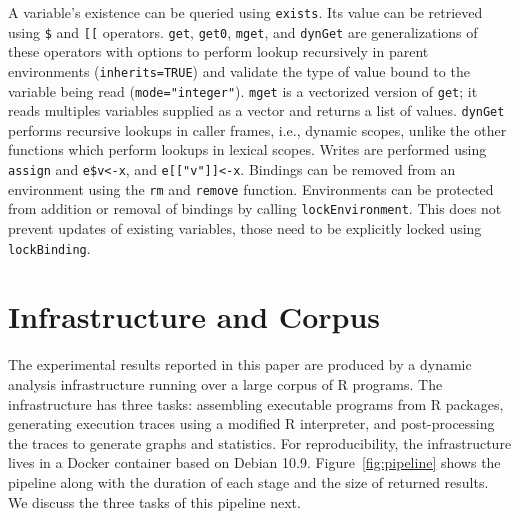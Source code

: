 \documentclass[10pt,sigplan,authorversion=true]{acmart}
\renewcommand{\c}[1]{\lstinline |#1|\xspace}
\newcommand{\subDollar}{\c{$}}
\newcommand{\subBracket}{\c{[[}}
\newcommand{\exist}{\c{exists}}
\newcommand{\get}{\c{get}}
\newcommand{\getZero}{\c{get0}}
\newcommand{\mget}{\c{mget}}
\newcommand{\dynGet}{\c{dynGet}}
\newcommand{\assign}{\c{assign}}
\newcommand{\remove}{\c{remove}}
\renewcommand{\rm}{\c{rm}}
\newcommand{\lockEnvironment}{\c{lockEnvironment}}
\newcommand{\lockBinding}{\c{lockBinding}}
\begin{document}
\noindent
A variable's existence can be queried using \exist. Its value can be retrieved
using \subDollar and \subBracket operators. \get, \getZero, \mget, and \dynGet
are generalizations of these operators with options to perform lookup
recursively in parent environments (\c{inherits=TRUE}) and validate the type of
value bound to the variable being read (\c{mode="integer"}). \mget is a
vectorized version of \get; it reads multiples variables supplied as a vector
and returns a list of values. \dynGet performs recursive lookups in caller
frames, i.e., dynamic scopes, unlike the other functions which perform lookups
in lexical scopes. Writes are performed using \assign and \c{e$v<-x}, and
\c{e[["v"]]<-x}. Bindings can be removed from an environment using the \rm and
\remove function.
Environments can be protected from addition or removal of bindings by calling
\lockEnvironment. This does not prevent updates of existing variables, those
need to be explicitly locked using \lockBinding.


\section{Infrastructure and Corpus}

The experimental results reported in this paper are produced by a dynamic
analysis infrastructure running over a large corpus of R programs. The
infrastructure has three tasks: assembling executable programs from R packages,
generating execution traces using a modified R interpreter, and post-processing
the traces to generate graphs and statistics. For reproducibility, the
infrastructure lives in a Docker container based on Debian 10.9.
Figure~\ref{fig:pipeline} shows the pipeline along with the duration of
each stage and the size of returned results. We discuss the three tasks of this
pipeline next.
\end{document}
